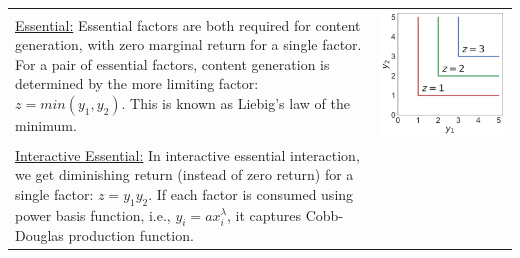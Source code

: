 \begin{table}[h!]
  \centering
  \begin{tabular}{m{}c}
    \vspace{-5pt}
    \uline{Essential:} Essential factors are both required for content generation, with zero marginal return for a single factor. For a pair of essential factors, content generation is determined by the more limiting factor: $z = min(y_1, y_2)$. This is known as Liebig's law of the minimum.
    &
    \begin{minipage}{.17\textwidth}
      \includegraphics[width=\textwidth, height=\textwidth]{Figures/Essential.pdf}
    \end{minipage}
    \\ 
    \vspace{-5pt}
    \uline{Interactive Essential:} In interactive essential interaction, we get diminishing return (instead of zero return) for a single factor: $z = y_1y_2$. If each factor is consumed using power basis function, i.e., $y_i = ax^\lambda_i$, it captures Cobb-Douglas production function.

\end{tabular}
\end{table}
